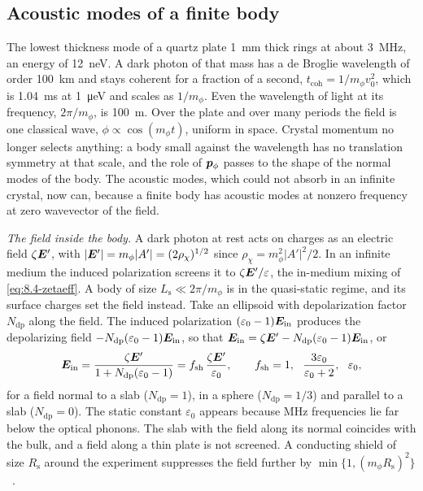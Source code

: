 \subsection{Acoustic modes of a finite body}\label{sec:11.8-bar}

The lowest thickness mode of a quartz plate \SI{1}{mm} thick rings at about \SI{3}{MHz}, an energy of \SI{12}{neV}. A dark photon of that mass has a de Broglie wavelength of order \SI{100}{km} and stays coherent for a fraction of a second, $t_{\mathrm{coh}} = 1/m_\phi v_0^2$, which is \SI{1.04}{ms} at \SI{1}{\micro eV} and scales as $1/m_\phi$. Even the wavelength of light at its frequency, $2\pi/m_\phi$, is \SI{100}{m}. Over the plate and over many periods the field is one classical wave, $\phi \propto \cos(m_\phi t)$, uniform in space. Crystal momentum no longer selects anything: a body small against the wavelength has no translation symmetry at that scale, and the role of $\bm{p}_\phi$ passes to the shape of the normal modes of the body. The acoustic modes, which could not absorb in an infinite crystal, now can, because a finite body has acoustic modes at nonzero frequency at zero wavevector of the field.

\emph{The field inside the body.} A dark photon at rest acts on charges as an electric field $\zeta\bm{E}'$, with $|\bm{E}'| = m_\phi|A'| = (2\rho_\chi)^{1/2}$ since $\rho_\chi = m_\phi^2|A'|^2/2$. In an infinite medium the induced polarization screens it to $\zeta\bm{E}'/\varepsilon$, the in-medium mixing of \cref{eq:8.4-zetaeff}. A body of size $L_{\mathrm{s}} \ll 2\pi/m_\phi$ is in the quasi-static regime, and its surface charges set the field instead. Take an ellipsoid with depolarization factor $N_{\mathrm{dp}}$ along the field. The induced polarization $(\varepsilon_0 - 1)\bm{E}_{\mathrm{in}}$ produces the depolarizing field $-N_{\mathrm{dp}}(\varepsilon_0 - 1)\bm{E}_{\mathrm{in}}$, so that $\bm{E}_{\mathrm{in}} = \zeta\bm{E}' - N_{\mathrm{dp}}(\varepsilon_0 - 1)\bm{E}_{\mathrm{in}}$, or
\begin{equation}
  \bm{E}_{\mathrm{in}} = \frac{\zeta\bm{E}'}{1 + N_{\mathrm{dp}}(\varepsilon_0 - 1)} = f_{\mathrm{sh}}\,\frac{\zeta\bm{E}'}{\varepsilon_0} ,
  \qquad f_{\mathrm{sh}} = 1,\ \ \frac{3\varepsilon_0}{\varepsilon_0 + 2},\ \ \varepsilon_0 ,
  \label{eq:11.8-shape}
\end{equation}
for a field normal to a slab ($N_{\mathrm{dp}} = 1$), in a sphere ($N_{\mathrm{dp}} = 1/3$) and parallel to a slab ($N_{\mathrm{dp}} = 0$). The static constant $\varepsilon_0$ appears because MHz frequencies lie far below the optical phonons. The slab with the field along its normal coincides with the bulk, and a field along a thin plate is not screened. A conducting shield of size $R_{\mathrm{s}}$ around the experiment suppresses the field further by $\min\{1, (m_\phi R_{\mathrm{s}})^2\}$~\cite[Eq.~(5)]{trickle2025piezoelectric}.

